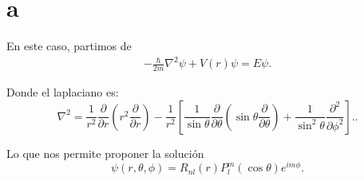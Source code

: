 \documentclass{report}
\begin{document}
\section{a}

En este caso, partimos de
\begin{align*}
  -\frac{\hbar}{2m}\nabla^2 \psi + V\left( r \right) \psi = E\psi
.\end{align*}

Donde el laplaciano es: \[
\nabla^2 = \frac{1}{r^2} \frac{\partial}{\partial r} \left( r^2 \frac{\partial}{\partial r} \right) - \frac{1}{r^2} \left[ \frac{1}{\sin\theta} \frac{\partial}{\partial \theta} \left( \sin\theta \frac{\partial}{\partial \theta} \right) + \frac{1}{\sin^2\theta} \frac{\partial^2}{\partial \phi^2} \right].
.\] 

Lo que nos permite proponer la solución 
\[
\psi(r, \theta, \phi) = R_{nl}(r) P_l^m(\cos\theta) e^{im\phi}.
\]
\end{document}
